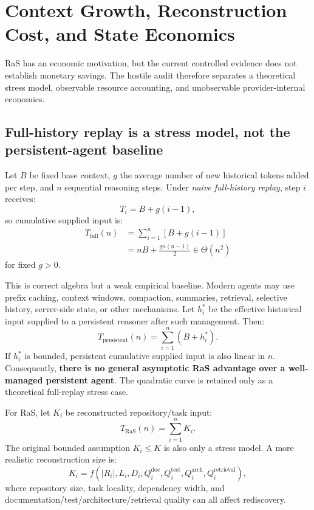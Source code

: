 \section{Context Growth, Reconstruction Cost, and State Economics}
\label{sec:cost}

RaS has an economic motivation, but the current controlled evidence does not establish monetary savings. The hostile audit therefore separates a theoretical stress model, observable resource accounting, and unobservable provider-internal economics.

\subsection{Full-history replay is a stress model, not the persistent-agent baseline}

Let $B$ be fixed base context, $g$ the average number of new historical tokens added per step, and $n$ sequential reasoning steps. Under \emph{naive full-history replay}, step $i$ receives:
\begin{equation}
T_i=B+g(i-1),
\end{equation}
so cumulative supplied input is:
\begin{align}
T_{\mathrm{full}}(n)
&=\sum_{i=1}^{n}[B+g(i-1)] \\
&=nB+\frac{gn(n-1)}{2}
\in\Theta(n^2)
\end{align}
for fixed $g>0$.

This is correct algebra but a weak empirical baseline. Modern agents may use prefix caching, context windows, compaction, summaries, retrieval, selective history, server-side state, or other mechanisms. Let $h_i^*$ be the effective historical input supplied to a persistent reasoner after such management. Then:
\begin{equation}
T_{\mathrm{persistent}}(n)=\sum_{i=1}^{n}(B+h_i^*).
\label{eq:persistent-general}
\end{equation}
If $h_i^*$ is bounded, persistent cumulative supplied input is also linear in $n$. Consequently, \textbf{there is no general asymptotic RaS advantage over a well-managed persistent agent}. The quadratic curve is retained only as a theoretical full-replay stress case.

For RaS, let $K_i$ be reconstructed repository/task input:
\begin{equation}
T_{\mathrm{RaS}}(n)=\sum_{i=1}^{n}K_i.
\end{equation}
The original bounded assumption $K_i\le K$ is also only a stress model. A more realistic reconstruction size is:
\begin{equation}
K_i=f(|R_i|,L_i,D_i,Q_i^{\mathrm{doc}},Q_i^{\mathrm{test}},Q_i^{\mathrm{arch}},Q_i^{\mathrm{retrieval}}),
\label{eq:realistic-k}
\end{equation}
where repository size, task locality, dependency width, and documentation/test/architecture/retrieval quality can all affect rediscovery.

